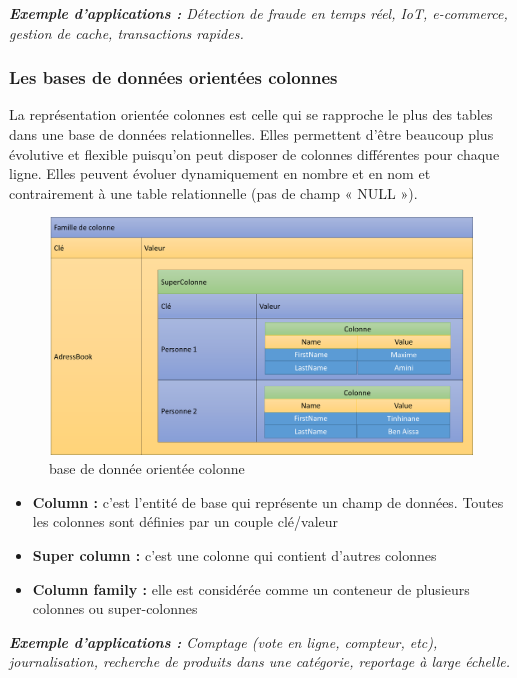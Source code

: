 \textit{\textbf{Exemple d'applications :} Détection de fraude en temps réel, IoT, e-commerce, gestion de cache, transactions rapides.}

\subsubsection{Les bases de données orientées colonnes}
La représentation orientée colonnes est celle qui se rapproche le plus des tables dans une base de données relationnelles. Elles permettent d'être beaucoup plus évolutive et flexible puisqu'on peut disposer de colonnes différentes pour chaque ligne. Elles peuvent évoluer dynamiquement en nombre et en nom et contrairement à une table relationnelle (pas de champ « NULL »).

\begin{figure}[h]
	\centering
    \includegraphics[scale=0.26]{img/part1/4.4}
    \caption{base de donnée orientée colonne}
\end{figure}
\bigskip \bigskip \bigskip  \bigskip  \bigskip 
\begin{itemize}[label=\textbullet]
\item \textbf{Column :} c’est l’entité de base qui représente un champ de données. Toutes les colonnes sont définies par un couple clé/valeur
\item \textbf{Super column :} c’est une colonne qui contient d’autres colonnes
\item \textbf{Column family :} elle est considérée comme un conteneur de plusieurs colonnes ou super-colonnes
\end{itemize}

\textit{\textbf{Exemple d'applications :} Comptage (vote en ligne, compteur, etc), journalisation, recherche de produits dans une catégorie, reportage à large échelle.}

